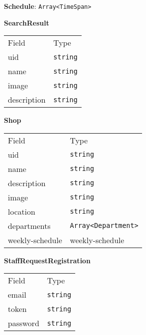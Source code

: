 \begin{center}\textbf{Schedule}: \texttt{Array<TimeSpan>}\end{center}


    \begin{table}[H]
    \centering
    \textbf{SearchResult}\\
    \everyrow{\tabucline[0.5pt]-}
    \begin{tabu} to 0.55\textwidth {|X|X|} \hline
    Field & Type \\
    uid & \texttt{string} \\
name & \texttt{string} \\
image & \texttt{string} \\
description & \texttt{string} \\
\end{tabu}
\end{table}


    \begin{table}[H]
    \centering
    \textbf{Shop}\\
    \everyrow{\tabucline[0.5pt]-}
    \begin{tabu} to 0.55\textwidth {|X|X|} \hline
    Field & Type \\
    uid & \texttt{string} \\
name & \texttt{string} \\
description & \texttt{string} \\
image & \texttt{string} \\
location & \texttt{string} \\
departments & \texttt{Array<Department>} \\
weekly-schedule & weekly-schedule \\
\end{tabu}
\end{table}


    \begin{table}[H]
    \centering
    \textbf{StaffRequestRegistration}\\
    \everyrow{\tabucline[0.5pt]-}
    \begin{tabu} to 0.55\textwidth {|X|X|} \hline
    Field & Type \\
    email & \texttt{string} \\
token & \texttt{string} \\
password & \texttt{string} \\
\end{tabu}
\end{table}


